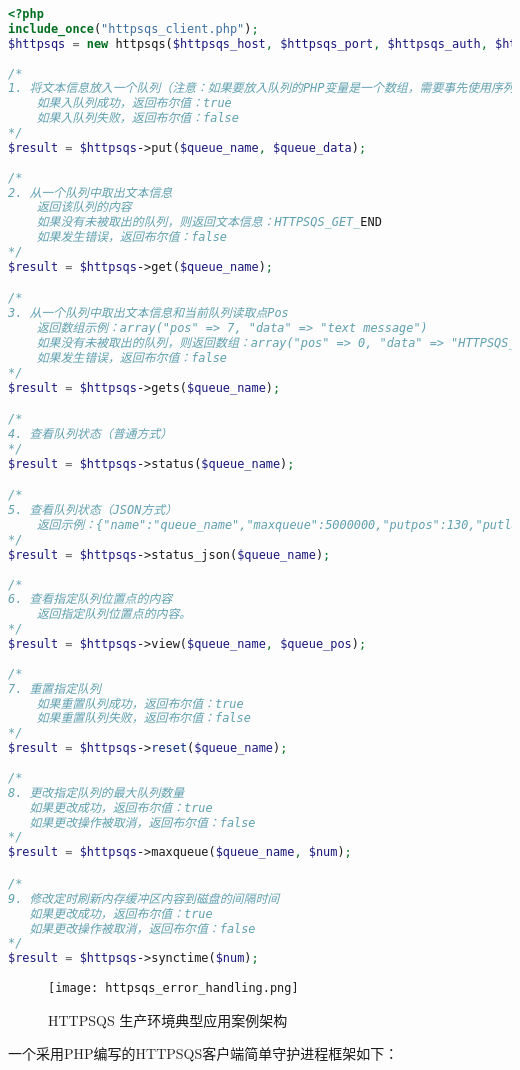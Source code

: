 \begin{lstlisting}[language=PHP]
<?php
include_once("httpsqs_client.php"); 
$httpsqs = new httpsqs($httpsqs_host, $httpsqs_port, $httpsqs_auth, $httpsqs_charset); 
 
/* 
1. 将文本信息放入一个队列（注意：如果要放入队列的PHP变量是一个数组，需要事先使用序列化、json_encode等函数转换成文本）
    如果入队列成功，返回布尔值：true 
    如果入队列失败，返回布尔值：false 
*/ 
$result = $httpsqs->put($queue_name, $queue_data); 
 
/* 
2. 从一个队列中取出文本信息
    返回该队列的内容
    如果没有未被取出的队列，则返回文本信息：HTTPSQS_GET_END
    如果发生错误，返回布尔值：false 
*/ 
$result = $httpsqs->get($queue_name); 

/* 
3. 从一个队列中取出文本信息和当前队列读取点Pos
    返回数组示例：array("pos" => 7, "data" => "text message")
    如果没有未被取出的队列，则返回数组：array("pos" => 0, "data" => "HTTPSQS_GET_END")
    如果发生错误，返回布尔值：false
*/ 
$result = $httpsqs->gets($queue_name);

/* 
4. 查看队列状态（普通方式）
*/ 
$result = $httpsqs->status($queue_name);

/* 
5. 查看队列状态（JSON方式）
    返回示例：{"name":"queue_name","maxqueue":5000000,"putpos":130,"putlap":1,"getpos":120,"getlap":1,"unread":10}
*/ 
$result = $httpsqs->status_json($queue_name);
 
/* 
6. 查看指定队列位置点的内容
    返回指定队列位置点的内容。
*/ 
$result = $httpsqs->view($queue_name, $queue_pos);
 
/* 
7. 重置指定队列
    如果重置队列成功，返回布尔值：true 
    如果重置队列失败，返回布尔值：false 
*/ 
$result = $httpsqs->reset($queue_name);
 
/* 
8. 更改指定队列的最大队列数量
   如果更改成功，返回布尔值：true
   如果更改操作被取消，返回布尔值：false
*/ 
$result = $httpsqs->maxqueue($queue_name, $num);

/*
9. 修改定时刷新内存缓冲区内容到磁盘的间隔时间
   如果更改成功，返回布尔值：true
   如果更改操作被取消，返回布尔值：false
*/
$result = $httpsqs->synctime($num);
\end{lstlisting}



\begin{figure}[htbp]
\centering
\texttt{[image: httpsqs\_error\_handling.png]}
\caption{HTTPSQS 生产环境典型应用案例架构}
\end{figure}


一个采用PHP编写的HTTPSQS客户端简单守护进程框架如下：


